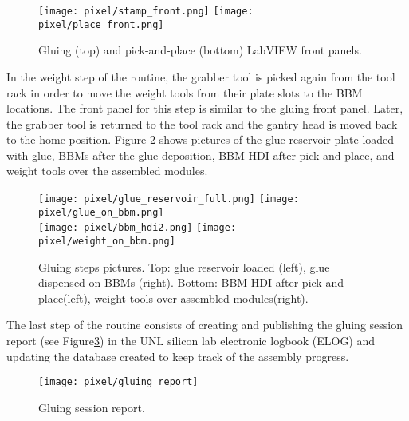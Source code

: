 \begin{figure}[h]
\begin{center}
  \texttt{[image: pixel/stamp\_front.png]}
  \texttt{[image: pixel/place\_front.png]}
 \caption[Gluing and pick-and-place LabVIEW front panels]{Gluing (top) and pick-and-place (bottom) LabVIEW front panels.}\label{fig:stamp_place_front}
\end{center}
\end{figure}

In the weight step of the routine, the grabber tool is picked again from the tool rack in order to move the weight tools from their plate slots to the BBM locations. The front panel for this step is similar to the gluing front panel. Later, the grabber tool is returned to the tool rack and the gantry head is moved back to the home position. Figure \ref{fig:gluing_steps} shows pictures of the glue reservoir plate loaded with glue, BBMs after the glue deposition, BBM-HDI after pick-and-place, and weight tools over the assembled modules. 

\begin{figure}[h]
\begin{center}
  \texttt{[image: pixel/glue\_reservoir\_full.png]}
  \texttt{[image: pixel/glue\_on\_bbm.png]}\\
  \texttt{[image: pixel/bbm\_hdi2.png]}
  \texttt{[image: pixel/weight\_on\_bbm.png]}
  \caption[Gluing steps pictures.]{Gluing steps pictures. Top: glue reservoir loaded (left), glue dispensed on BBMs (right). Bottom: BBM-HDI after pick-and-place(left), weight tools over assembled modules(right).}\label{fig:gluing_steps}
\end{center}
\end{figure}

The last step of the routine consists of creating and publishing the gluing session report (see Figure\ref{fig:gluing_report}) in the UNL silicon lab electronic logbook (ELOG) and updating the database created to keep track of the assembly progress.  

\begin{figure}[h]
\begin{center}
  \texttt{[image: pixel/gluing\_report]}
 \caption[Gluing session report.]{Gluing session report.}\label{fig:gluing_report}
\end{center}
\end{figure}

